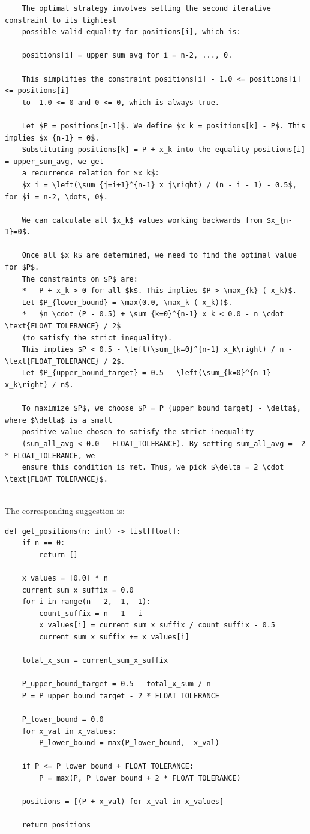 {\small
\begin{verbatim}
    The optimal strategy involves setting the second iterative constraint to its tightest
    possible valid equality for positions[i], which is:

    positions[i] = upper_sum_avg for i = n-2, ..., 0.
    
    This simplifies the constraint positions[i] - 1.0 <= positions[i] <= positions[i]
    to -1.0 <= 0 and 0 <= 0, which is always true.
    
    Let $P = positions[n-1]$. We define $x_k = positions[k] - P$. This implies $x_{n-1} = 0$.
    Substituting positions[k] = P + x_k into the equality positions[i] = upper_sum_avg, we get
    a recurrence relation for $x_k$:
    $x_i = \left(\sum_{j=i+1}^{n-1} x_j\right) / (n - i - 1) - 0.5$, for $i = n-2, \dots, 0$.
    
    We can calculate all $x_k$ values working backwards from $x_{n-1}=0$.
    
    Once all $x_k$ are determined, we need to find the optimal value for $P$.
    The constraints on $P$ are:
    *   P + x_k > 0 for all $k$. This implies $P > \max_{k} (-x_k)$.
    Let $P_{lower_bound} = \max(0.0, \max_k (-x_k))$.
    *   $n \cdot (P - 0.5) + \sum_{k=0}^{n-1} x_k < 0.0 - n \cdot \text{FLOAT_TOLERANCE} / 2$
    (to satisfy the strict inequality).
    This implies $P < 0.5 - \left(\sum_{k=0}^{n-1} x_k\right) / n - \text{FLOAT_TOLERANCE} / 2$.
    Let $P_{upper_bound_target} = 0.5 - \left(\sum_{k=0}^{n-1} x_k\right) / n$.
    
    To maximize $P$, we choose $P = P_{upper_bound_target} - \delta$, where $\delta$ is a small
    positive value chosen to satisfy the strict inequality
    (sum_all_avg < 0.0 - FLOAT_TOLERANCE). By setting sum_all_avg = -2 * FLOAT_TOLERANCE, we
    ensure this condition is met. Thus, we pick $\delta = 2 \cdot \text{FLOAT_TOLERANCE}$.
    
\end{verbatim}
}

The corresponding \AlphaEvolve suggestion is:
{\small
\begin{verbatim}
def get_positions(n: int) -> list[float]:
    if n == 0:
        return []

    x_values = [0.0] * n
    current_sum_x_suffix = 0.0
    for i in range(n - 2, -1, -1):
        count_suffix = n - 1 - i
        x_values[i] = current_sum_x_suffix / count_suffix - 0.5
        current_sum_x_suffix += x_values[i]

    total_x_sum = current_sum_x_suffix

    P_upper_bound_target = 0.5 - total_x_sum / n
    P = P_upper_bound_target - 2 * FLOAT_TOLERANCE

    P_lower_bound = 0.0
    for x_val in x_values:
        P_lower_bound = max(P_lower_bound, -x_val)

    if P <= P_lower_bound + FLOAT_TOLERANCE:
        P = max(P, P_lower_bound + 2 * FLOAT_TOLERANCE)

    positions = [(P + x_val) for x_val in x_values]

    return positions

\end{verbatim}
}

